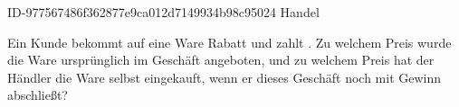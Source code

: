 \begin{exercise}
      {ID-977567486f362877e9ca012d7149934b98c95024}
      {Handel}
  \ifproblem\problem\par
    Ein Kunde bekommt auf eine Ware  Rabatt und zahlt .
    Zu welchem Preis wurde die Ware ursprünglich im Geschäft angeboten,
    und zu welchem Preis hat der Händler die Ware selbst eingekauft,
    wenn er dieses Geschäft noch mit  Gewinn abschließt?
  \fi
\end{exercise}
